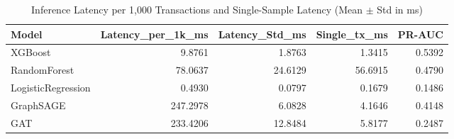 \begin{table}
\caption{Inference Latency per 1,000 Transactions and Single-Sample Latency (Mean $\pm$ Std in ms)}
\label{tab:latency_benchmark}
\begin{tabular}{lrrrr}
\toprule
Model & Latency_per_1k_ms & Latency_Std_ms & Single_tx_ms & PR-AUC \\
\midrule
XGBoost & 9.8761 & 1.8763 & 1.3415 & 0.5392 \\
RandomForest & 78.0637 & 24.6129 & 56.6915 & 0.4790 \\
LogisticRegression & 0.4930 & 0.0797 & 0.1679 & 0.1486 \\
GraphSAGE & 247.2978 & 6.0828 & 4.1646 & 0.4148 \\
GAT & 233.4206 & 12.8484 & 5.8177 & 0.2487 \\
\bottomrule
\end{tabular}
\end{table}
